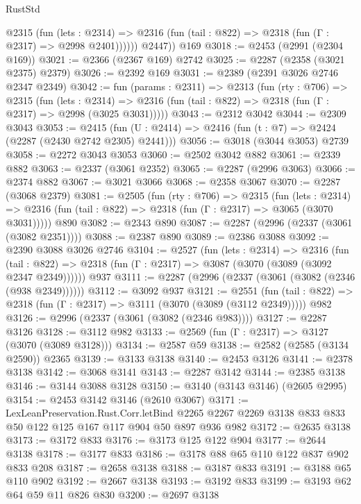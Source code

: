 \begin{lexlean}{RustStd}
\begin{coremodule}
            @2315
              (fun (lets : @2314) =>
              @2316 (fun (tail : @822) => @2318 (fun (Γ : @2317) => @2998 @2401))))))
        @2447))
    @169
@3018 := @2453 (@2991 (@2304 @169))
@3021 := @2366 (@2367 @169) @2742
@3025 := @2287 (@2358 (@3021 @2375) @2379)
@3026 := @2392 @169
@3031 := @2389 (@2391 @3026 @2746 @2347 @2349)
@3042 := fun (params : @2311) =>
  @2313
    (fun (rty : @706) =>
    @2315
      (fun (lets : @2314) =>
      @2316 (fun (tail : @822) => @2318 (fun (Γ : @2317) => @2998 (@3025 @3031)))))
@3043 := @2312 @3042
@3044 := @2309 @3043
@3053 := @2415 (fun (U : @2414) => @2416 (fun (t : @7) => @2424 (@2287 (@2430 @2742 @2305) @2441)))
@3056 := @3018 (@3044 @3053) @2739
@3058 := @2272 @3043 @3053
@3060 := @2502 @3042 @882
@3061 := @2339 @882
@3063 := @2337 (@3061 @2352)
@3065 := @2287 (@2996 @3063)
@3066 := @2374 @882
@3067 := @3021 @3066
@3068 := @2358 @3067
@3070 := @2287 (@3068 @2379)
@3081 := @2505
    (fun (rty : @706) =>
    @2315
      (fun (lets : @2314) =>
      @2316 (fun (tail : @822) => @2318 (fun (Γ : @2317) => @3065 (@3070 @3031)))))
    @890
@3082 := @2343 @890
@3087 := @2287 (@2996 (@2337 (@3061 (@3082 @2351))))
@3088 := @2387 @890
@3089 := @2386 @3088
@3092 := @2390 @3088 @3026 @2746
@3104 := @2527
    (fun (lets : @2314) =>
    @2316
      (fun (tail : @822) => @2318 (fun (Γ : @2317) => @3087 (@3070 (@3089 (@3092 @2347 @2349))))))
    @937
@3111 := @2287 (@2996 (@2337 (@3061 (@3082 (@2346 (@938 @2349))))))
@3112 := @3092 @937
@3121 := @2551
    (fun (tail : @822) => @2318 (fun (Γ : @2317) => @3111 (@3070 (@3089 (@3112 @2349)))))
    @982
@3126 := @2996 (@2337 (@3061 (@3082 (@2346 @983))))
@3127 := @2287 @3126
@3128 := @3112 @982
@3133 := @2569 (fun (Γ : @2317) => @3127 (@3070 (@3089 @3128)))
@3134 := @2587 @59
@3138 := @2582 (@2585 (@3134 @2590)) @2365
@3139 := @3133 @3138
@3140 := @2453 @3126
@3141 := @2378 @3138
@3142 := @3068 @3141
@3143 := @2287 @3142
@3144 := @2385 @3138
@3146 := @3144 @3088 @3128
@3150 := @3140 (@3143 @3146) (@2605 @2995)
@3154 := @2453 @3142 @3146 (@2610 @3067)
@3171 := LexLeanPreservation.Rust.Corr.letBind
    @2265
    @2267
    @2269
    @3138
    @833
    @833
    @50
    @122
    @125
    @167
    @117
    @904
    @50
    @897
    @936
    @982
@3172 := @2635 @3138
@3173 := @3172 @833
@3176 := @3173 @125 @122 @904
@3177 := @2644 @3138
@3178 := @3177 @833
@3186 := @3178 @88 @65 @110 @122 @837 @902 @833 @208
@3187 := @2658 @3138
@3188 := @3187 @833
@3191 := @3188 @65 @110 @902
@3192 := @2667 @3138
@3193 := @3192 @833
@3199 := @3193 @62 @64 @59 @11 @826 @830
@3200 := @2697 @3138

\end{coremodule}
\end{lexlean}
